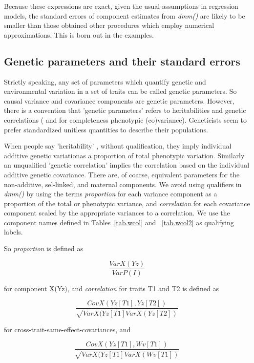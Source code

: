 \documentclass[titlepage]{article}  %
\begin{document}
Because these expressions are exact, given the usual assumptions in regression models, the standard errors of component estimates from {\em dmm()} are likely to be smaller than those obtained other procedures which employ numerical approximations. This is born out in the examples.

\clearpage
\subsection{Genetic parameters and their standard errors}
Strictly speaking, any set of parameters which quantify genetic and environmental variation in a set of traits can be called genetic parameters. So causal variance and covariance components are genetic parameters. However, there is a convention that 'genetic parameters' refers to heritabilities and genetic correlations ( and for completeness phenotypic (co)variance). Geneticists seem to prefer standardized unitless quantities to describe their populations.
 
 When people say 'heritability' , without qualification, they imply individual additive genetic variationas a proportion of total phenotypic variation. Similarly an unqualified 'genetic correlation' implies the correlation based on the individual additive genetic covariance. There are, of coarse, equivalent parameters for the non-additive, sel-linked, and maternal components. We avoid using qualifiers in {\em dmm()} by using the terms {\em proportion} for each variance component as a proportion of the total or phenotypic variance, and {\em correlation} for each covariance component scaled by the appropriate variances to a correlation. We use the component names defined in Tables~\ref{tab.wcol} and ~\ref{tab.wcol2} as qualifying labels.

So {\em proportion} is defined as 

\begin{displaymath}
\frac{VarX(Yz)}{VarP(I)}
\end{displaymath}

for component X(Yz), and {\em correlation} for traits T1 and T2  is defined as

\begin{displaymath}
\frac{CovX(Yz[T1],Yz[T2])}{\sqrt{VarX(Yz[T1] VarX(Yz[T2])}}
\end{displaymath}

for cross-trait-same-effect-covariances, and

\begin{displaymath}
\frac{CovX(Yz[T1],Wv[T1])}{\sqrt{VarX(Yz[T1] VarX(Wv[T1])}}
\end{displaymath}
\end{document}

